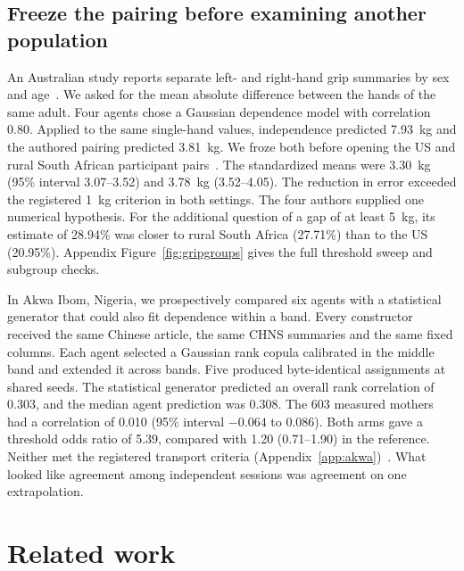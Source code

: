 \documentclass[sigconf,anonymous,review]{acmart}
\begin{document}
\subsection{Freeze the pairing before examining another population}
\label{sec:gripmain}
An Australian study reports separate left- and right-hand grip summaries by sex and age~\cite{grip_adelaide}. We asked for the mean absolute difference between the hands of the same adult. Four agents chose a Gaussian dependence model with correlation 0.80. Applied to the same single-hand values, independence predicted 7.93~kg and the authored pairing predicted 3.81~kg. We froze both before opening the US and rural South African participant pairs~\cite{grip_cdc,grip_haalsi}. The standardized means were 3.30~kg (95\% interval 3.07--3.52) and 3.78~kg (3.52--4.05). The reduction in error exceeded the registered 1~kg criterion in both settings. The four authors supplied one numerical hypothesis. For the additional question of a gap of at least 5~kg, its estimate of 28.94\% was closer to rural South Africa (27.71\%) than to the US (20.95\%). Appendix Figure~\ref{fig:gripgroups} gives the full threshold sweep and subgroup checks.

In Akwa Ibom, Nigeria, we prospectively compared six agents with a statistical generator that could also fit dependence within a band. Every constructor received the same Chinese article, the same CHNS summaries and the same fixed columns. Each agent selected a Gaussian rank copula calibrated in the middle band and extended it across bands. Five produced byte-identical assignments at shared seeds. The statistical generator predicted an overall rank correlation of 0.303, and the median agent prediction was 0.308. The 603 measured mothers had a correlation of 0.010 (95\% interval $-0.064$ to 0.086). Both arms gave a threshold odds ratio of 5.39, compared with 1.20 (0.71--1.90) in the reference. Neither met the registered transport criteria (Appendix~\ref{app:akwa})~\cite{akwa_iron}. What looked like agreement among independent sessions was agreement on one extrapolation.

\section{Related work}
\end{document}
